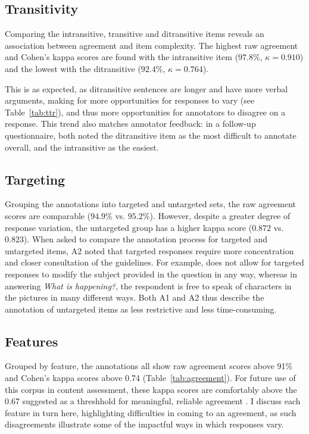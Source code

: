 \subsection{Transitivity} 
\label{sec:transitivity}
Comparing the intransitive, transitive and ditransitive items reveals an association between agreement and item complexity. The highest raw agreement and Cohen's kappa scores are found with the intransitive item ($97.8\%$, $\kappa=0.910$) and the lowest with the ditransitive ($92.4\%$, $\kappa=0.764$). 

This is as expected, as ditransitive sentences are longer and have more verbal arguments, making for more opportunities for responses to vary (see Table~\ref{tab:ttr}), and thus more opportunities for annotators to disagree on a response. This trend also matches annotator feedback: in a follow-up questionnaire, both noted the ditransitive item as the most difficult to annotate overall, and the intransitive as the easiest.

\subsection{Targeting} 
\label{sec:prompts}
Grouping the annotations into targeted and untargeted sets, the raw agreement scores are comparable ($94.9\%$ vs. $95.2\%$). However, despite a greater degree of response variation, the untargeted group has a higher kappa score ($0.872$ vs. $0.823$).
%
%
When asked to compare the annotation process for targeted and untargeted items, A2 noted that targeted responses require more concentration and closer consultation of the guidelines. For example,  does not allow for targeted responses to modify the subject provided in the question in any way, whereas in answering \textit{What is happening?}, the respondent is free to speak of characters in the pictures in many different ways.  Both A1 and A2 thus describe the annotation of untargeted items as less restrictive and less time-consuming.

\subsection{Features} 
\label{sec:features}
Grouped by feature, the annotations all show raw agreement scores above 91\% and Cohen's kappa scores above 0.74 (Table~\ref{tab:agreement}). For future use of this corpus in content assessment, these kappa scores are comfortably above the 0.67 suggested as a threshhold for meaningful, reliable agreement \citep{landis1977measurement, artstein:massimo:2008}.  I discuss each feature in turn here, highlighting difficulties in coming to an agreement, as such disagreements illustrate some of the impactful ways in which responses vary.

